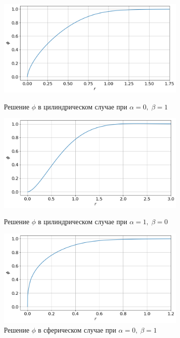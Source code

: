 \begin{figure}[!tp]
	\centering
	\includegraphics[width=0.83\textwidth]{figures/result_volumes_cyl_p.png}
	\vspace{-0.4cm}
	\caption{Решение $\phi$ в цилиндрическом случае при $\alpha = 0, \; \beta = 1$}
	\label{fig:result_volumes_cyl_p}
	\vspace{0.5cm}

	\includegraphics[width=0.83\textwidth]{figures/result_volumes_cyl_bi.png}
	\vspace{-0.4cm}
	\caption{Решение $\phi$ в цилиндрическом случае при $\alpha = 1, \; \beta = 0$}
	\label{fig:result_volumes_cyl_bi}
	\vspace{0.5cm}
	
	\includegraphics[width=0.83\textwidth]{figures/result_volumes_sph_p.png}
	\vspace{-0.4cm}
	\caption{Решение $\phi$ в сферическом случае при $\alpha = 0, \; \beta = 1$}
	\label{fig:result_volumes_sph_p}
\end{figure}


